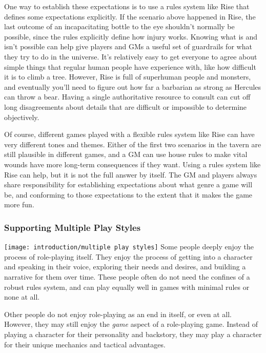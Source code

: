       One way to establish these expectations is to use a rules system like Rise that defines some expectations explicitly.
      If the scenario above happened in Rise, the last outcome of an incapacitating bottle to the eye shouldn't normally be possible, since the rules explicitly define how injury works.
      Knowing what is and isn't possible can help give players and GMs a useful set of guardrails for what they try to do in the universe.
      It's relatively easy to get everyone to agree about simple things that regular human people have experience with, like how difficult it is to climb a tree.
      However, Rise is full of superhuman people and monsters, and eventually you'll need to figure out how far a barbarian as strong as Hercules can throw a bear.
      Having a single authoritative resource to consult can cut off long disagreements about details that are difficult or impossible to determine objectively.

      Of course, different games played with a flexible rules system like Rise can have very different tones and themes.
      Either of the first two scenarios in the tavern are still plausible in different games, and a GM can use house rules to make vital wounds have more long-term consequences if they want.
      Using a rules system like Rise can help, but it is not the full answer by itself.
      The GM and players always share responsibility for establishing expectations about what genre a game will be, and conforming to those expectations to the extent that it makes the game more fun.

    \subsubsection{Supporting Multiple Play Styles}
      \texttt{[image: introduction/multiple play styles]}
      Some people deeply enjoy the process of role-playing itself.
      They enjoy the process of getting into a character and speaking in their voice, exploring their needs and desires, and building a narrative for them over time.
      These people often do not need the confines of a robust rules system, and can play equally well in games with minimal rules or none at all.

      Other people do not enjoy role-playing as an end in itself, or even at all.
      However, they may still enjoy the \textit{game} aspect of a role-playing game.
      Instead of playing a character for their personality and backstory, they may play a character for their unique mechanics and tactical advantages.

